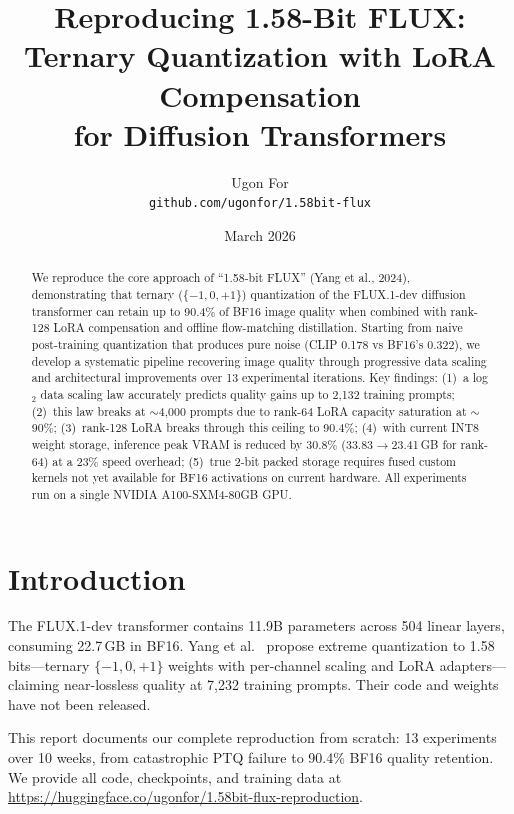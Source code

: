 \documentclass[11pt]{article}
\title{\textbf{Reproducing 1.58-Bit FLUX:\\Ternary Quantization with LoRA Compensation\\for Diffusion Transformers}}
\author{Ugon For \\ \texttt{github.com/ugonfor/1.58bit-flux}}
\date{March 2026}
\begin{document}
\maketitle

\begin{abstract}
We reproduce the core approach of ``1.58-bit FLUX'' (Yang et al., 2024), demonstrating that ternary ($\{-1, 0, +1\}$) quantization of the FLUX.1-dev diffusion transformer can retain up to 90.4\% of BF16 image quality when combined with rank-128 LoRA compensation and offline flow-matching distillation.
Starting from naive post-training quantization that produces pure noise (CLIP 0.178 vs BF16's 0.322), we develop a systematic pipeline recovering image quality through progressive data scaling and architectural improvements over 13 experimental iterations.
Key findings: (1)~a log$_2$ data scaling law accurately predicts quality gains up to 2{,}132 training prompts; (2)~this law breaks at $\sim$4{,}000 prompts due to rank-64 LoRA capacity saturation at $\sim$90\%; (3)~rank-128 LoRA breaks through this ceiling to 90.4\%; (4)~with current INT8 weight storage, inference peak VRAM is reduced by 30.8\% (33.83$\to$23.41\,GB for rank-64) at a 23\% speed overhead; (5)~true 2-bit packed storage requires fused custom kernels not yet available for BF16 activations on current hardware.
All experiments run on a single NVIDIA A100-SXM4-80GB GPU.
\end{abstract}

\section{Introduction}

The FLUX.1-dev transformer \cite{flux} contains 11.9B parameters across 504 linear layers, consuming 22.7\,GB in BF16.
Yang et al.\ \cite{yang2024} propose extreme quantization to 1.58 bits---ternary $\{-1, 0, +1\}$ weights with per-channel scaling and LoRA adapters---claiming near-lossless quality at 7{,}232 training prompts.
Their code and weights have not been released.

This report documents our complete reproduction from scratch: 13 experiments over 10 weeks, from catastrophic PTQ failure to 90.4\% BF16 quality retention.
We provide all code, checkpoints, and training data at \url{https://huggingface.co/ugonfor/1.58bit-flux-reproduction}.
\end{document}
